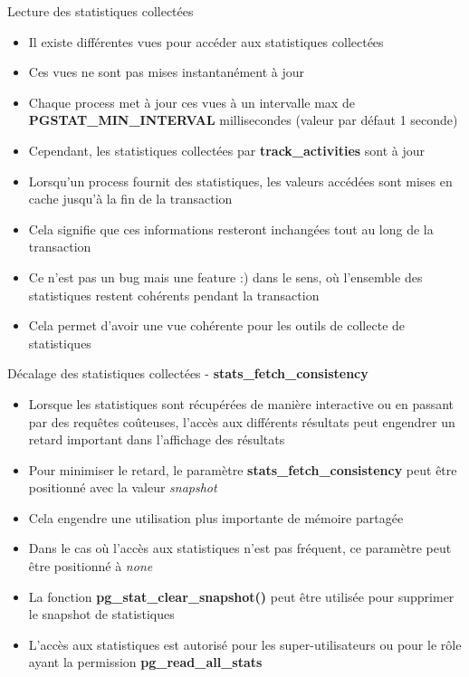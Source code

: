 \begin{frame}[fragile]{Lecture des statistiques collectées}

   \begin{itemize}
      \item Il existe différentes vues pour accéder aux statistiques collectées
      \item Ces vues ne sont pas mises instantanément à jour
      \item Chaque process met à jour ces vues à un intervalle max de \textbf{PGSTAT\_MIN\_INTERVAL} millisecondes (valeur par défaut 1 seconde)
      \item Cependant, les statistiques collectées par \textbf{track\_activities} sont à jour
      \item Lorsqu'un process fournit des statistiques, les valeurs accédées sont mises en cache jusqu'à la fin de la transaction
      \item Cela signifie que ces informations resteront inchangées tout au long de la transaction
      \item Ce n'est pas un bug mais une feature :) dans le sens, où l'ensemble des statistiques restent cohérents pendant la transaction
      \item Cela permet d'avoir une vue cohérente pour les outils de collecte de statistiques
   \end{itemize}

\end{frame}


\begin{frame}[fragile]{Décalage des statistiques collectées - \textbf{stats\_fetch\_consistency}}

   \begin{itemize}
      \item Lorsque les statistiques sont récupérées de manière interactive ou en passant par des requêtes coûteuses, l'accès aux différents résultats peut engendrer un retard important dans l'affichage des résultats
      \item Pour minimiser le retard, le paramètre \textbf{stats\_fetch\_consistency} peut être positionné avec la valeur \textit{snapshot}
      \item Cela engendre une utilisation plus importante de mémoire partagée
      \item Dans le cas où l'accès aux statistiques n'est pas fréquent, ce paramètre peut être positionné à \textit{none}
      \item La fonction \textbf{pg\_stat\_clear\_snapshot()} peut être utilisée pour supprimer le snapshot de statistiques
      \item L'accès aux statistiques est autorisé pour les super-utilisateurs ou pour le rôle ayant la permission \textbf{pg\_read\_all\_stats}
   \end{itemize}

\end{frame}

